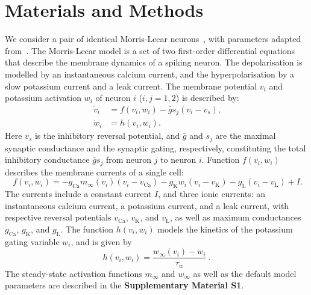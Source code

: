 \documentclass[utf8,draft]{frontiersFPHY} %
\renewcommand{\k}{\mathrm{K}}
\newcommand{\ca}{\mathrm{Ca}}
\newcommand{\leak}{\mathrm{L}}
\newcommand{\gbar}{\bar g}
\begin{document}
\section{Materials and Methods}
We consider a pair of identical Morris-Lecar neurons~\citep{morris1981}, with parameters adapted from~\cite{bose2011}.
The Morris-Lecar model is a set of two first-order differential equations that describe the membrane dynamics of a spiking neuron.
The depolarisation is modelled by an instantaneous calcium current, and the hyperpolarisation by a slow potassium current and a leak current.
The membrane potential $v_{i}$ and potassium activation $w_{i}$ of neuron $i$ ($i, j=1,2$) is described by:
\begin{align}
    ~\label{eq:cell-modelA}
     \dot v_{i}&= f(v_{i}, w_{i}) -\gbar s_j(v_i-v_{s}),\\
    ~\label{eq:cell-modelB}
     \dot w_{i} &=h(v_i,w_i).
   \end{align}
Here $v_{s}$ is the inhibitory reversal potential, and $\gbar$ and $s_{j}$ are the maximal synaptic conductance and the synaptic gating, respectively, constituting the total inhibitory conductance $\gbar s_{j}$ from neuron $j$ to neuron $i$.
Function $f(v_{i}, w_{i})$ describes the membrane currents of a single cell:
\begin{equation}
 ~\label{eq:memcur}
  f(v_{i}, w_{i}) = -g_{\ca}m_{\infty}(v_{i})(v_{i}-v_{\ca}) - g_{\k}w_{i}(v_{i}-v_{\k})-g_{\leak}(v_{i}-v_{\leak}) + I.
\end{equation}
The currents include a constant current $I$, and three ionic currents:
an instantaneous calcium current, a potassium current, and a leak current, with respective reversal potentials $v_{\ca}$, $v_{\k}$, and $v_{\leak}$, as well as maximum conductances $g_{\ca}$, $g_{\k}$, and $g_{\leak}$.
The function $h(v_{i}, w_{i})$ models the kinetics of the potassium gating variable $w_{i}$, and is given by
\begin{equation}
  h(v_{i}, w_{i})=\frac{w_{\infty}(v_{i})-w_{i}}{\tau_{w}}~\label{eq:h}.
\end{equation}
The steady-state activation functions $m_{\infty}$ and $w_{\infty}$ as well as the default model parameters are described in the \textbf{Supplementary Material S1}.
\end{document}

